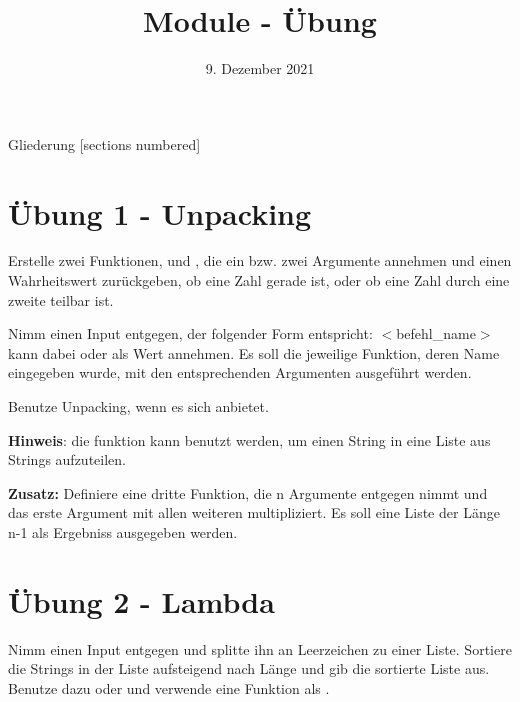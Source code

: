 



\title{Module - Übung}
\date{9. Dezember 2021}


\maketitle

\begin{frame}{Gliederung}
	[sections numbered]
	\tableofcontents
\end{frame}

\section{Übung 1 - Unpacking}
\begin{frame}
	Erstelle zwei Funktionen,  und , die ein bzw. zwei Argumente annehmen und einen Wahrheitswert zurückgeben, ob eine Zahl gerade ist, oder ob eine Zahl durch eine zweite teilbar ist.
	
	Nimm einen Input entgegen, der folgender Form entspricht:
	$<$befehl\_name$>$ kann dabei  oder  als Wert annehmen.
	Es soll die jeweilige Funktion, deren Name eingegeben wurde, mit den entsprechenden Argumenten ausgeführt werden.
	
	Benutze \alert{Unpacking}, wenn es sich anbietet.
	
	\textbf{Hinweis}: die  funktion kann benutzt werden, um einen String in eine Liste aus Strings aufzuteilen.
\end{frame}
\begin{frame}
	\textbf{Zusatz:}
	Definiere eine dritte Funktion,  die n Argumente entgegen nimmt und das erste Argument mit allen weiteren multipliziert. Es soll eine Liste der Länge n-1 als Ergebniss ausgegeben werden.
\end{frame}

\section{Übung 2 - Lambda}
\begin{frame}
	Nimm einen Input entgegen und splitte ihn an Leerzeichen zu einer Liste. Sortiere die Strings in der Liste aufsteigend nach Länge und gib die sortierte Liste aus.
	Benutze dazu  oder  und verwende eine  Funktion als .
\end{frame}


